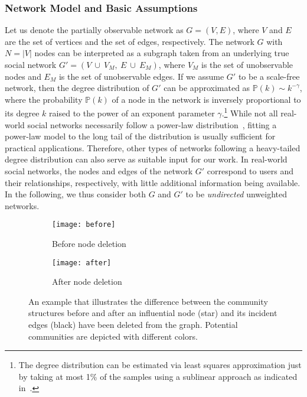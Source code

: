 \documentclass[format=acmsmall, review=false, screen=true]{acmart}
\begin{document}
\subsubsection{Network Model and Basic Assumptions}
Let us denote the partially observable network as $G = (V, E)$, where $V$ and $E$ are the set of vertices and the set of edges, respectively. The network $G$ with $N=|V|$ nodes can be interpreted as a subgraph taken from an underlying true social network $G' = (V~\cup~V_M,~E~\cup~E_M)$, where $V_M$ is the set of unobservable nodes and $E_M$ is the set of unobservable edges. If we assume $G'$ to be a scale-free network, then the degree distribution of $G'$ can be approximated as $\mathbb{P}(k) \sim k^{-\gamma}$, where the probability $\mathbb{P}(k)$ of a node in the network is inversely proportional to its degree $k$ raised to the power of an exponent parameter $\gamma$.\footnote{The degree distribution can be estimated via least squares approximation just by taking at most 1\% of the samples using a sublinear approach as indicated in~\cite{estimateexponent}.} 
While not all real-world social networks necessarily follow a power-law distribution~\cite{clauset2009powerLaw}, fitting a power-law model to the long tail of the distribution is usually sufficient for practical applications. Therefore, other types of networks following a heavy-tailed degree distribution can also serve as suitable input for our work. In real-world social networks, the nodes and edges of the network $G'$ correspond to users and their relationships, respectively, with little additional information being available. In the following, we thus consider both $G$ and $G'$ to be {\em undirected} unweighted networks.
\begin{figure}[!t]
    \begin{center}
        \begin{subfigure}[]{0.25\textwidth}
		\centering
            \texttt{[image: before]}
            \caption{{Before node deletion}}
            \label{fig:before}
        \end{subfigure}%
        \begin{subfigure}[]{0.25\textwidth}
		\centering
            \texttt{[image: after]}
            \caption{{After node deletion} }
            \label{fig:after}
        \end{subfigure}
    \end{center}
    \caption{An example that illustrates the difference between the community structures before and after an influential node (star) and its incident edges (black) have been deleted from the graph. Potential communities are depicted with different colors.}
    \label{fig:changestructure}
\end{figure}
\end{document}
